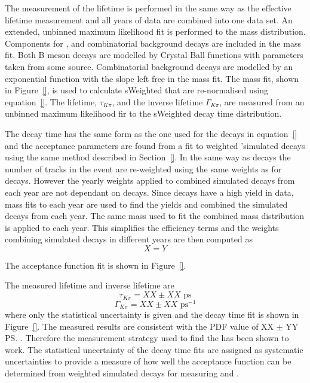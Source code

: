 The measurement of the \bdki lifetime is performed in the same way as the \bsmumu effective lifetime measurement and all years of data are combined into one data set. An extended, unbinned maximum likelihood fit is performed to the \bdkpi mass distribution. Components for \bdkpi, \bskpi and combinatorial background decays are included in the mass fit. Both B meson decays are modelled by Crystal Ball functions with parameters taken from some source. Combinatorial background decays are modelled by an exponential function with the slope left free in the mass fit. The mass fit, shown in Figure~\ref{}, is used to calculate sWeighted that are re-normalised using equation~\ref{}. The lifetime, $\tau_{K\pi}$, and the inverse lifetime $\Gamma_{K\pi}$, are measured from an unbinned maximum likelihood fir to the sWeighted decay time distribution. 

The decay time \pdf has the same form as the one used for the \bsmumu decays in equation~\ref{} and the acceptance parameters are found from a fit to weighted '\bdkpi simulated decays using the same method described in Section~\ref{}. In the same way as \bsmumu decays the number of tracks in the event are re-weighted using the same weights as for \bsmumu decays. However the yearly weights applied to combined simulated \bdkpi decays from each year are not dependant on \bsjpsiphi decays. Since \bdkpi decays have a high yield in data, mass fits to each year are used to find the yields and combined the simulated decays from each year. The same mass \pdf used to fit the combined mass distribution is applied to each year. This simplifies the efficiency terms and the weights combining simulated decays in different years are then computed as
\begin{equation}
X = Y
\end{equation}

The acceptance function fit is shown in Figure~\ref{}. 

The measured \bdkpi lifetime and inverse lifetime are
\begin{equation}
\tau_{K\pi} = XX \pm XX  \text{ ps} 
\end{equation}
\begin{equation}
\Gamma_{K\pi} = XX  \pm XX \text{ ps}^{-1}
\end{equation}
where only the statistical uncertainty is given and the decay time fit is shown in Figure~\ref{}. The measured results are consistent with the PDF value of XX $\pm$ YY \ps. Therefore the measurement strategy used to find the \bsmumu \el has been shown to work. The statistical uncertainty of the \bdkpi decay time fits are assigned as systematic uncertainties to provide a measure of how well the acceptance function can be determined from weighted simulated decays for measuring \tmumu and \Gmumu. 

